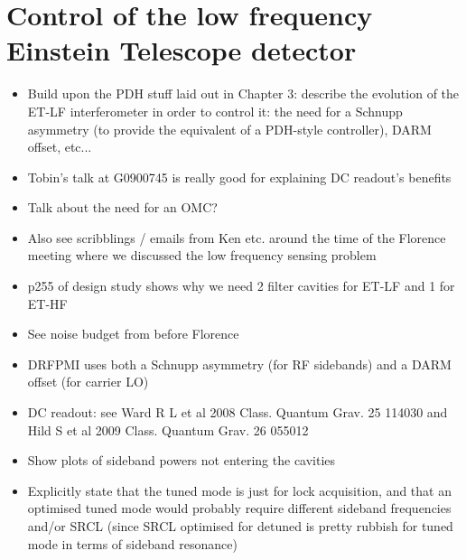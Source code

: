 \chapter{\label{c:et-lf-control}Control of the low frequency Einstein Telescope detector}

\begin{itemize}
  \item Build upon the PDH stuff laid out in Chapter 3: describe the evolution of the ET-LF interferometer in order to control it: the need for a Schnupp asymmetry (to provide the equivalent of a PDH-style controller), DARM offset, etc...
  
  \item Tobin's talk at G0900745 is really good for explaining DC readout's benefits
  
  \item Talk about the need for an OMC?
  
  \item Also see scribblings / emails from Ken etc. around the time of the Florence meeting where we discussed the low frequency sensing problem
  
  \item p255 of design study shows why we need 2 filter cavities for ET-LF and 1 for ET-HF
  
  \item See noise budget from before Florence
  
  \item DRFPMI uses both a Schnupp asymmetry (for RF sidebands) and a DARM offset (for carrier LO)
  
  \item DC readout: see Ward R L et al 2008 Class. Quantum Grav. 25 114030 and Hild S et al 2009 Class. Quantum Grav. 26 055012
  
  \item Show plots of sideband powers not entering the cavities
  
  \item Explicitly state that the tuned mode is just for lock acquisition, and that an optimised tuned mode would probably require different sideband frequencies and/or SRCL (since SRCL optimised for detuned is pretty rubbish for tuned mode in terms of sideband resonance)


\end{itemize}
